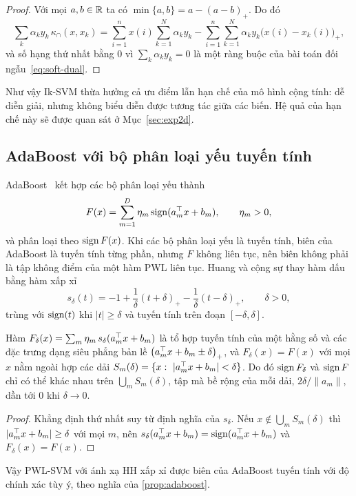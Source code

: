 \begin{proof}
Với mọi $a,b\in\mathbb{R}$ ta có $\min\{a,b\}=a-(a-b)_+$. Do đó
\[
\sum_k\alpha_ky_k\,\kappa_\cap(x,x_k)=\sum_{i=1}^{n}x(i)\sum_{k=1}^{N}\alpha_ky_k-\sum_{i=1}^{n}\sum_{k=1}^{N}\alpha_ky_k\bigl(x(i)-x_k(i)\bigr)_+ ,
\]
và số hạng thứ nhất bằng $0$ vì $\sum_k\alpha_ky_k=0$ là một ràng buộc của bài toán đối ngẫu~\eqref{eq:soft-dual}.
\end{proof}

Như vậy Ik-SVM thừa hưởng cả ưu điểm lẫn hạn chế của mô hình cộng tính: dễ diễn giải, nhưng không biểu diễn được tương tác giữa các biến. Hệ quả của hạn chế này sẽ được quan sát ở Mục~\ref{sec:exp2d}.

\subsection{AdaBoost với bộ phân loại yếu tuyến tính}

AdaBoost~\cite{freund1995} kết hợp các bộ phân loại yếu thành
\[
F(x)=\sum_{m=1}^{D}\eta_m\operatorname{sign}(a_m^\top x+b_m),\qquad \eta_m>0,
\]
và phân loại theo $\operatorname{sign} F(x)$. Khi các bộ phân loại yếu là tuyến tính, biên của AdaBoost là tuyến tính từng phần, nhưng $F$ không liên tục, nên biên không phải là tập không điểm của một hàm PWL liên tục. Huang và cộng sự thay hàm dấu bằng hàm xấp xỉ
\[
s_\delta(t)=-1+\frac1\delta(t+\delta)_+-\frac1\delta(t-\delta)_+,\qquad\delta>0,
\]
trùng với $\operatorname{sign}(t)$ khi $|t|\ge\delta$ và tuyến tính trên đoạn $[-\delta,\delta]$.

\begin{proposition}\label{prop:adaboost}
Hàm $F_\delta(x)=\sum_m\eta_m\,s_\delta(a_m^\top x+b_m)$ là tổ hợp tuyến tính của một hằng số và các đặc trưng dạng siêu phẳng bản lề $\bigl(a_m^\top x+b_m\pm\delta\bigr)_+$, và $F_\delta(x)=F(x)$ với mọi $x$ nằm ngoài hợp các dải $S_m(\delta)=\{x:\ |a_m^\T x+b_m|<\delta\}$. Do đó $\operatorname{sign} F_\delta$ và $\operatorname{sign} F$ chỉ có thể khác nhau trên $\bigcup_mS_m(\delta)$, tập mà bề rộng của mỗi dải, $2\delta/\|a_m\|$, dần tới $0$ khi $\delta\to0$.
\end{proposition}

\begin{proof}
Khẳng định thứ nhất suy từ định nghĩa của $s_\delta$. Nếu $x\notin\bigcup_mS_m(\delta)$ thì $|a_m^\top x+b_m|\ge\delta$ với mọi $m$, nên $s_\delta(a_m^\top x+b_m)=\operatorname{sign}(a_m^\top x+b_m)$ và $F_\delta(x)=F(x)$.
\end{proof}

Vậy PWL-SVM với ánh xạ HH xấp xỉ được biên của AdaBoost tuyến tính với độ chính xác tùy ý, theo nghĩa của \cref{prop:adaboost}.

